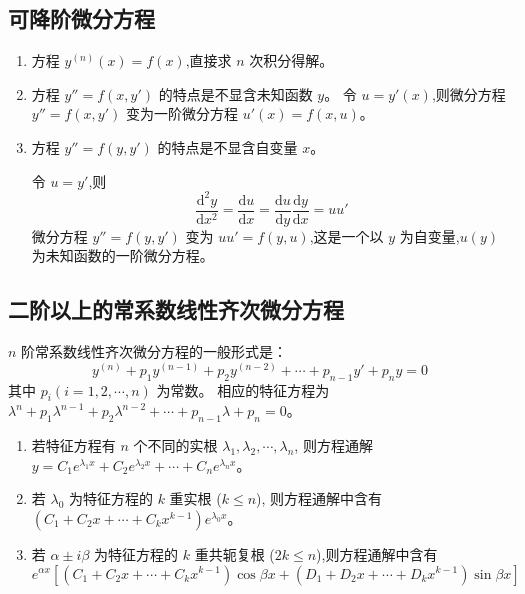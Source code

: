 \documentclass[UTF8]{ctexart}
\theoremstyle{remark}
\begin{document}
		\subsection{可降阶微分方程}
		\begin{enumerate}
			\item 方程 \(y^{(n)}(x)=f(x)\),直接求 \(n\) 次积分得解。
			\item 方程 \(y'' = f(x, y')\) 的特点是不显含未知函数 \(y\)。
			令 \(u = y'(x)\),则微分方程 \(y'' = f(x, y')\) 变为一阶微分方程 \(u'(x)=f(x, u)\)。
			\item 方程 \(y'' = f(y, y')\) 的特点是不显含自变量 \(x\)。
	
			令 \(u = y'\),则
			\[
			\frac{\mathrm{d}^{2}y}{\mathrm{d}x^{2}}=\frac{\mathrm{d}u}{\mathrm{d}x}=\frac{\mathrm{d}u}{\mathrm{d}y}\frac{\mathrm{d}y}{\mathrm{d}x}=uu'
			\]
			微分方程 \(y'' = f(y, y')\) 变为 \(uu' = f(y, u)\),这是一个以 \(y\) 为自变量,\(u(y)\) 为未知函数的一阶微分方程。
			
		\end{enumerate}
		
		\subsection{二阶以上的常系数线性齐次微分方程}
		\(n\) 阶常系数线性齐次微分方程的一般形式是：
		\[
		y^{(n)}+p_1y^{(n - 1)}+p_2y^{(n - 2)}+\cdots + p_{n - 1}y'+p_ny = 0
		\]
		其中 \(p_i (i = 1, 2, \cdots, n)\) 为常数。
		相应的特征方程为 \(\lambda^{n}+p_1\lambda^{n - 1}+p_2\lambda^{n - 2}+\cdots + p_{n - 1}\lambda + p_n = 0\)。
		\begin{enumerate}
			\item 若特征方程有 \(n\) 个不同的实根 \(\lambda_1, \lambda_2, \cdots, \lambda_n\),
			则方程通解 \(y = C_1e^{\lambda_1 x}+C_2e^{\lambda_2 x}+\cdots + C_ne^{\lambda_n x}\)。
			\item 若 \(\lambda_0\) 为特征方程的 \(k\) 重实根 (\(k\leq n\)),
			则方程通解中含有 \((C_1 + C_2x+\cdots + C_kx^{k - 1})e^{\lambda_0 x}\)。
			\item 若 \(\alpha\pm i\beta\) 为特征方程的 \(k\) 重共轭复根 (\(2k\leq n\)),则方程通解中含有
			\[
			e^{\alpha x}\left[(C_1 + C_2x+\cdots + C_kx^{k - 1})\cos\beta x+(D_1 + D_2x+\cdots + D_kx^{k - 1})\sin\beta x\right]
			\]
		\end{enumerate}
		
\end{document}
